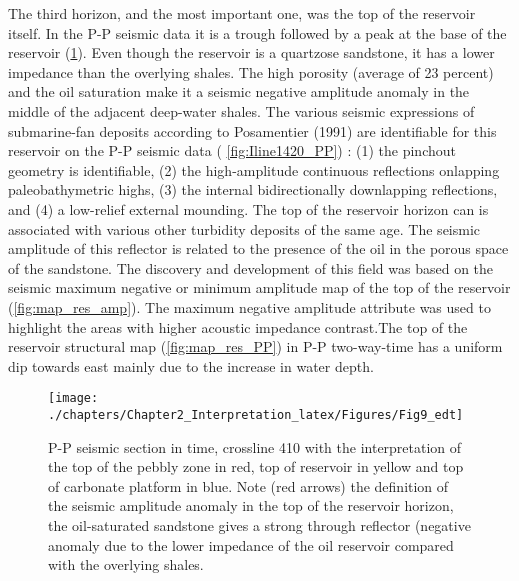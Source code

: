 	
The third horizon, and the most important one, was the top of the reservoir itself. In the P-P seismic data it is a trough followed by a peak at the base of the reservoir (\ref{fig:xline410_PP}). Even though the reservoir is a quartzose sandstone, it has a lower impedance than the overlying shales.  The high porosity (average of 23 percent) and the oil saturation make it a seismic negative amplitude anomaly in the middle of the adjacent deep-water shales. The various seismic expressions of submarine-fan deposits according to Posamentier (1991) are identifiable for this reservoir on the P-P seismic data ( \ref{fig:Iline1420_PP}) : (1) the pinchout geometry is identifiable, (2)  the high-amplitude continuous reflections onlapping paleobathymetric highs, (3) the internal bidirectionally downlapping reflections, and (4) a low-relief external mounding. The top of the reservoir horizon can is associated with various other turbidity deposits of the same age.  The seismic amplitude of this reflector is related to the presence of the oil in the porous space of the sandstone. The discovery and development of this field was based on the seismic maximum negative or minimum amplitude map of the top of the reservoir (\ref{fig:map_res_amp}). The maximum negative amplitude attribute was used to highlight the areas with higher acoustic impedance contrast.The top of the reservoir structural map (\ref{fig:map_res_PP}) in P-P two-way-time has a uniform dip towards east mainly due to the increase in water depth.
	
	
\begin{figure}[hbtp]
	\begin{center}
	\texttt{[image: ./chapters/Chapter2\_Interpretation\_latex/Figures/Fig9\_edt]}
			\caption[P-P seismic section in time, crossline 410 with the interpretation of the top of the pebbly zone, top of reservoir and top of carbonate platform.]{P-P seismic section in time, crossline 410 with the interpretation of the top of the pebbly zone in red, top of reservoir in yellow and top of carbonate platform in blue. Note (red arrows) the definition of the seismic amplitude anomaly in the top of the reservoir horizon, the oil-saturated sandstone gives a strong through reflector (negative anomaly due to the lower impedance of the oil reservoir compared with the overlying shales.}
			\label{fig:xline410_PP}
		\end{center}
	\end{figure}
	
